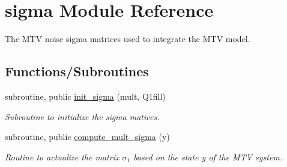 \hypertarget{namespacesigma}{}\section{sigma Module Reference}
\label{namespacesigma}


The M\+TV noise sigma matrices used to integrate the M\+TV model.  


\subsection*{Functions/\+Subroutines}
\begin{DoxyCompactItemize}
\item 
subroutine, public \hyperlink{namespacesigma_a740d1f7a96c6b4c8a902fcc8113b29a9}{init\+\_\+sigma} (mult, Q1fill)
\begin{DoxyCompactList}\small\item\em Subroutine to initialize the sigma matices. \end{DoxyCompactList}\item 
subroutine, public \hyperlink{namespacesigma_ac61cf00c42223c0bf14e37eb00b3259c}{compute\+\_\+mult\+\_\+sigma} (y)
\begin{DoxyCompactList}\small\item\em Routine to actualize the matrix $\sigma_1$ based on the state y of the M\+TV system. \end{DoxyCompactList}\end{DoxyCompactItemize}

